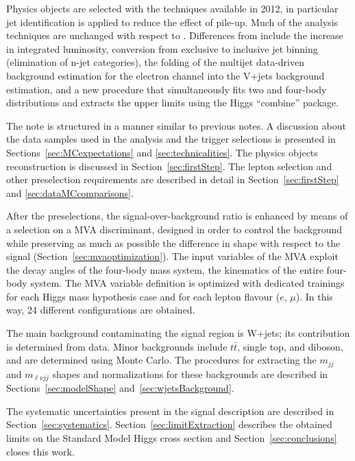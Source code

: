 Physics objects are selected with the techniques available in 2012, in
particular jet identification is applied to reduce the effect of
pile-up. Much of the analysis techniques are unchanged with respect to
\cite{HIG-12-046}. Differences from \cite{HIG-12-046} include the
increase in integrated luminosity, conversion from exclusive to
inclusive jet binning (elimination of n-jet categories), the folding
of the multijet data-driven background estimation for the electron
channel into the V+jets background estimation, and a new procedure
that simultaneously fits two and four-body distributions and extracts
the upper limits using the Higgs ``combine'' package.

The note is structured in a manner similar to previous notes.  A
discussion about the data samples used in the analysis and the trigger
selections is presented in Sections~\ref{sec:MCexpectations} and
\ref{sec:technicalities}.  The physics objects reconstruction is
discussed in Section~\ref{sec:firstStep}.  The lepton selection and
other preselection requirements are described in detail in
Section~\ref{sec:firstStep} and \ref{sec:dataMCcomparisons}.

After the preselections, the signal-over-background ratio is enhanced
by means of a selection on a MVA discriminant, designed in order to
control the background while preserving as much as possible the
difference in shape with respect to the signal
(Section~\ref{sec:mvaoptimization}).  The input variables of the MVA
exploit the decay angles of the four-body mass system, the kinematics
of the entire four-body system. The MVA variable definition is
optimized with dedicated trainings for each Higgs mass hypothesis case
and for each lepton flavour ($e$, $\mu$).  In this way, 24 different
configurations are obtained.

The main background contaminating the signal region is W+jets; its
contribution is determined from data.  Minor backgrounds include
$t\bar{t}$, single top, and diboson, and are determined using Monte
Carlo. The procedures for extracting the $m_{jj}$ and
$m_{\ell{}\nu{}jj}$ shapes and normalizations for these backgrounds
are described in Sections~\ref{sec:modelShape}
and~\ref{sec:wjetsBackground}.

The systematic uncertainties present in the signal description are
described in Section~\ref{sec:systematics}.
Section~\ref{sec:limitExtraction} describes the obtained limits on the
Standard Model Higgs cross section and Section~\ref{sec:conclusions}
closes this work.

